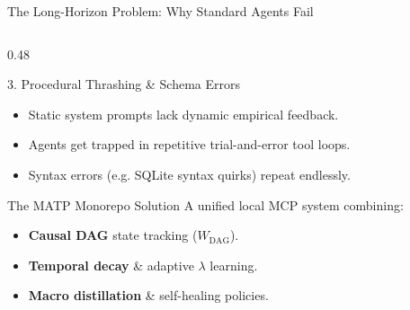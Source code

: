 \documentclass[aspectratio=169,10pt]{beamer}
\begin{document}
\begin{frame}{The Long-Horizon Problem: Why Standard Agents Fail}
\begin{columns}[T,onlytextwidth]
    \begin{column}{0.48\textwidth}
      \begin{alertblock}{3. Procedural Thrashing \& Schema Errors}
        \begin{itemize}
          \item Static system prompts lack dynamic empirical feedback.
          \item Agents get trapped in repetitive trial-and-error tool loops.
          \item Syntax errors (e.g. SQLite syntax quirks) repeat endlessly.
        \end{itemize}
      \end{alertblock}
      \vspace{0.3em}
      \begin{exampleblock}{The MATP Monorepo Solution}
        A unified local MCP system combining:
        \begin{itemize}
          \item \textbf{Causal DAG} state tracking ($W_{\text{DAG}}$).
          \item \textbf{Temporal decay} \& adaptive $\lambda$ learning.
          \item \textbf{Macro distillation} \& self-healing policies.
        \end{itemize}
      \end{exampleblock}
    \end{column}
  \end{columns}
\end{frame}
\end{document}

